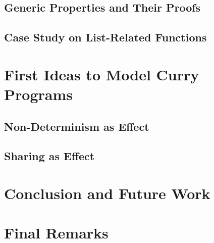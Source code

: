 \subsection{Generic Properties and Their Proofs}
\subsection{Case Study on List-Related Functions}

\section{First Ideas to Model Curry Programs}
\subsection{Non-Determinism as Effect}
\subsection{Sharing as Effect}

\section{Conclusion and Future Work}

\section{Final Remarks}
